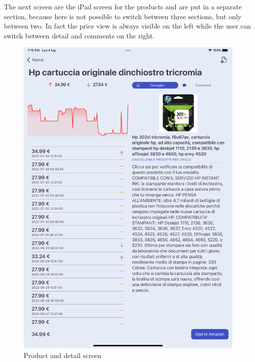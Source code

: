 The next screen are the iPad screen for the products and are put in a separate section, because here is not possible to switch between three sections, but only between two. In fact the price view is always visible on the left while the user can switch between detail and comments on the right.

\begin{figure}[h!]
        \centering
        \includegraphics[scale=0.15]{images/interfaces/product_and_detail_ipad.png}
        \caption{Product and detail screen}
        \label{fig:product_and_detail_ipad}
\end{figure}
\FloatBarrier

